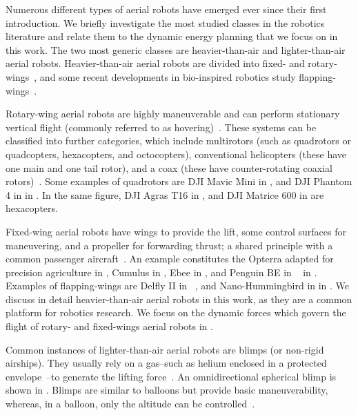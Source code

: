 Numerous different types of aerial robots have emerged ever since their first introduction. We briefly investigate the most studied classes in the robotics literature and relate them to the dynamic energy planning that we focus on in this work. The two most generic classes are heavier-than-air and lighter-than-air aerial robots. Heavier-than-air aerial robots are divided into fixed- and rotary-wings~\citep{siciliano2016springer}, and some recent developments in bio-inspired robotics study flapping-wings~\citep{floreano2015science}. 

Rotary-wing aerial robots are highly maneuverable and can perform stationary vertical flight (commonly referred to as hovering)~\citep{siciliano2016springer}. These systems can be classified into further categories, which include multirotors (such as quadrotors or quadcopters, hexacopters, and octocopters), conventional helicopters (these have one main and one tail rotor), and a coax (these have counter-rotating coaxial rotors)~\citep{corke2017robotics}. Some examples of quadrotors are DJI Mavic Mini in , and DJI Phantom 4 in  in . In the same figure, DJI Agras T16 in , and DJI Matrice 600 in  are hexacopters.

Fixed-wing aerial robots have wings to provide the lift, some control surfaces for maneuvering, and a propeller for forwarding thrust; a shared principle with a common passenger aircraft~\citep{corke2017robotics}. An example constitutes the Opterra adapted for precision agriculture in , Cumulus in , Ebee in , and Penguin BE in ~\citep{haugen2016monitoring} in . Examples of flapping-wings are Delfly II in ~\citep{percin2012flow}, and Nano-Hummingbird in  in . We discuss in detail heavier-than-air aerial robots in this work, as they are a common platform for robotics research. We focus on the dynamic forces which govern the flight of rotary- and fixed-wings aerial robots in .

Common instances of lighter-than-air aerial robots are blimps (or non-rigid airships). They usually rely on a gas--such as helium enclosed in a protected envelope~\citep{burri2013design}--to generate the lifting force~\citep{fui2017recent}. An omnidirectional spherical blimp is shown in . Blimps are similar to balloons but provide basic maneuverability, whereas, in a balloon, only the altitude can be controlled~\citep{colombatti2011lighter}.

